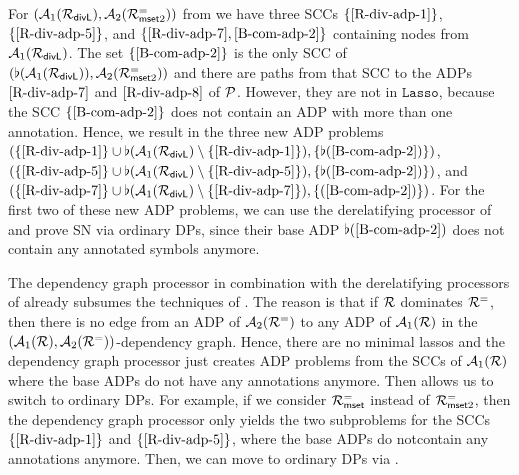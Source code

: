 \begin{example}\label{ex:DivlDepGraph}
    For $(\mathcal{A}_{1}(\mathcal{R}_{\mathsf{divL}}), \mathcal{A}_{2}(\mathcal{R}^{=}_{\mathsf{mset} 2}))$ from
     we have three SCCs 
    $\{\eqref{R-div-adp-1}\}$, $\{\eqref{R-div-adp-5}\}$, 
    and $\{\eqref{R-div-adp-7},\eqref{B-com-adp-2}\}$ containing nodes from $\mathcal{A}_{1}(\mathcal{R}_{\mathsf{divL}})$.
    The set $\{\eqref{B-com-adp-2}\}$ is the only
    SCC of $(\flat(\mathcal{A}_{1}(\mathcal{R}_{\mathsf{divL}})), \mathcal{A}_{2}(\mathcal{R}^{=}_{\mathsf{mset} 2}))$ and there
    are paths from that SCC to the ADPs $\eqref{R-div-adp-7}$ and
    $\eqref{R-div-adp-8}$ of $\mathcal{P}$. However, they are not in
    $\mathtt{Lasso}$, because the SCC $\{\eqref{B-com-adp-2}\}$ does not contain an ADP with more than one
    annotation.
    Hence, we result in the three new ADP problems 
    $(\{\eqref{R-div-adp-1}\} \cup \flat(\mathcal{A}_{1}(\mathcal{R}_{\mathsf{divL}}) \setminus \{\eqref{R-div-adp-1}\}), \{\flat(\ref{B-com-adp-2})\})$,
    $(\{\eqref{R-div-adp-5}\} \cup \flat(\mathcal{A}_{1}(\mathcal{R}_{\mathsf{divL}}) \setminus \{\eqref{R-div-adp-5}\}), \{\flat(\ref{B-com-adp-2})\})$,
    and 
    $(\{\eqref{R-div-adp-7}\} \cup \flat(\mathcal{A}_{1}(\mathcal{R}_{\mathsf{divL}}) \setminus \{\eqref{R-div-adp-7}\}),\{(\ref{B-com-adp-2})\})$.
    For the first two of these new ADP problems, 
    we can use the derelatifying processor of  and prove SN via ordinary DPs, since their base
    ADP $\flat(\ref{B-com-adp-2})$ does not contain any annotated symbols anymore.
\end{example}

The dependency graph processor in combination with the derelatifying processors of 
already subsumes the techniques of
.
The reason is that if $\mathcal{R}$ dominates $\mathcal{R}^{=}$, then there is no edge from an ADP of $\mathcal{A}_{2}(\mathcal{R}^{=})$ to
any ADP of $\mathcal{A}_{1}(\mathcal{R})$ in the $(\mathcal{A}_{1}(\mathcal{R}), \mathcal{A}_{2}(\mathcal{R}^{=}))$-dependency
graph. Hence, there are no minimal lassos and the
dependency graph processor just creates ADP problems from the SCCs of $\mathcal{A}_{1}(\mathcal{R})$
where the base ADPs do not have any annotations anymore. Then 
allows us to switch to ordinary DPs.
For example, if we consider $\mathcal{R}^{=}_{\mathsf{mset}}$ instead of $\mathcal{R}^{=}_{\mathsf{mset} 2}$, then the
dependency graph processor \pagebreak[2]  only yields the two subproblems for the SCCs 
$\{\eqref{R-div-adp-1}\}$ and $\{\eqref{R-div-adp-5}\}$, 
where the base ADPs do not\linebreak contain any annotations anymore.
Then, we can move to ordinary
DPs via .

